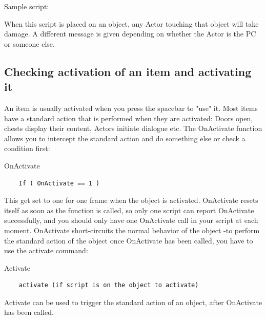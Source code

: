Sample script:

When this script is placed on an object, any Actor touching that object
will take damage. A different message is given depending on whether the
Actor is the PC or someone else.



%

\hypertarget{checking-activation-of-an-item-and-activating-it}{%
\subsection{Checking activation of an item and activating
it}\label{checking-activation-of-an-item-and-activating-it}}

An item is usually activated when you press the spacebar to "use" it.
Most items have a standard action that is performed when they are
activated: Doors open, chests display their content, Actors initiate
dialogue etc. The OnActivate function allows you to intercept the
standard action and do something else or check a condition first:

OnActivate
\begin{lstlisting}
	If ( OnActivate == 1 )
\end{lstlisting}

This get set to one for one frame when the object is activated.
OnActivate resets itself as soon as the function is called, so only one
script can report OnActivate successfully, and you should only have one
OnActivate call in your script at each moment. OnActivate short-circuits
the normal behavior of the object -to perform the standard action of the
object once OnActivate has been called, you have to use the activate
command:

Activate

\begin{lstlisting}
	activate (if script is on the object to activate)
\end{lstlisting}

Activate can be used to trigger the standard action of an object, after
OnActivate has been called.

